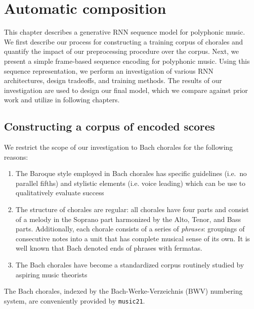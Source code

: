 \chapter{Automatic composition}
\minitoc
{}

\ifpdf
    \graphicspath{{Chapter4/Figs/Raster/}{Chapter4/Figs/PDF/}{Chapter4/Figs/}}
\else
    \graphicspath{{Chapter4/Figs/Vector/}{Chapter4/Figs/}}
\fi


This chapter describes a generative RNN sequence model for polyphonic music. We
first describe our process for constructing a training corpus of chorales and
quantify the impact of our preprocessing procedure over the corpus. Next, we
present a simple frame-based sequence encoding for polyphonic music. Using this
sequence representation, we perform an investigation of various RNN
architectures, design tradeoffs, and training methods. The results of our
investigation are used to design our final model, which we compare against
prior work and utilize in following chapters.

\section{Constructing a corpus of encoded scores}

We restrict the scope of our investigation to Bach chorales for the following reasons:
\begin{enumerate}
  \item The Baroque style employed in Bach chorales has specific guidelines
    \citep{piston1978harmony} (i.e.\ no parallel fifths) and stylistic elements
    (i.e. voice leading) which can be use to qualitatively evaluate success
  \item The structure of chorales are regular: all chorales have four parts and
    consist of a melody in the Soprano part harmonized by the Alto, Tenor, and
    Bass parts. Additionally, each chorale consists of a series of \emph{phrases}:
    groupings of consecutive notes into a unit that has complete musical sense
    of its own\citep{nattiez1990music}. It is well known that Bach
    denoted ends of phrases with fermatas.
  \item The Bach chorales have become a standardized corpus routinely studied
    by aspiring music theorists\citep{white2002guidelines}
\end{enumerate}
The Bach chorales, indexed by the Bach-Werke-Verzeichnis (BWV) numbering
system\citep{butt1999bach}, are conveniently provided by
\texttt{music21}\citep{Scott2015}.

